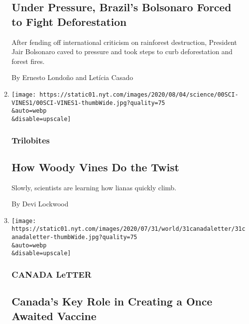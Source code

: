 \begin{enumerate}
{  \subsection{Under Pressure, Brazil's Bolsonaro Forced to Fight
  Deforestation}\label{under-pressure-brazils-bolsonaro-forced-to-fight-deforestation}}

  After fending off international criticism on rainforest destruction,
  President Jair Bolsonaro caved to pressure and took steps to curb
  deforestation and forest fires.

  By Ernesto Londoño and Letícia Casado
\item
  \href{/2020/08/01/science/vines-lianas-panama.html}{}

  \texttt{[image: https://static01.nyt.com/images/2020/08/04/science/00SCI-VINES1/00SCI-VINES1-thumbWide.jpg?quality=75\\\&auto=webp\\\&disable=upscale]}

  \hypertarget{trilobites}{%
  \subsubsection{Trilobites}\label{trilobites}}

  \hypertarget{how-woody-vines-do-the-twist}{%
  \subsection{How Woody Vines Do the
  Twist}\label{how-woody-vines-do-the-twist}}

  Slowly, scientists are learning how lianas quickly climb.

  By Devi Lockwood
\item
  \href{/2020/07/31/world/canada/leone-farrell-chemist.html}{}

  \texttt{[image: https://static01.nyt.com/images/2020/07/31/world/31canadaletter/31canadaletter-thumbWide.jpg?quality=75\\\&auto=webp\\\&disable=upscale]}

  \hypertarget{canada-letter}{%
  \subsubsection{CANADA LeTTER}\label{canada-letter}}

  \hypertarget{canadas-key-role-in-creating-a-once-awaited-vaccine}{%
  \subsection{Canada's Key Role in Creating a Once Awaited
  Vaccine}\label{canadas-key-role-in-creating-a-once-awaited-vaccine}}


\end{enumerate}
